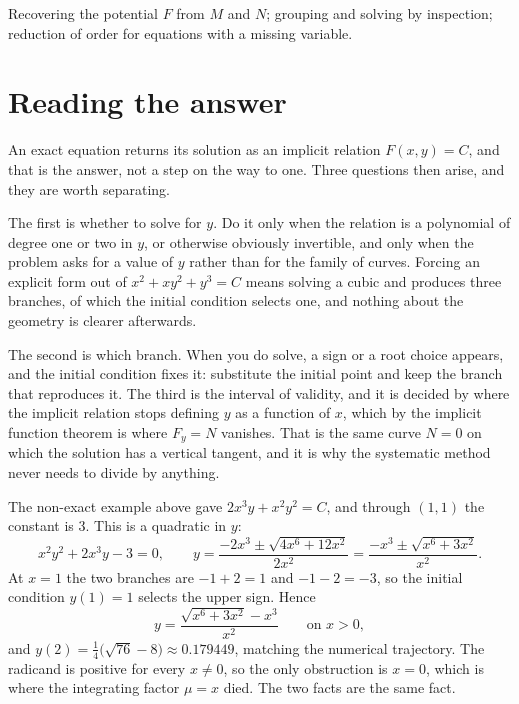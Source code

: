 \begin{seealsob}Recovering the potential $F$ from $M$ and $N$; grouping and solving by inspection; reduction of order for equations with a missing variable.\end{seealsob}

\section{Reading the answer}

An exact equation returns its solution as an implicit relation $F(x,y)=C$, and that is the answer, not a step on the way to one. Three questions then arise, and they are worth separating.

The first is whether to solve for $y$. Do it only when the relation is a polynomial of degree one or two in $y$, or otherwise obviously invertible, and only when the problem asks for a value of $y$ rather than for the family of curves. Forcing an explicit form out of $x^{2}+xy^{2}+y^{3}=C$ means solving a cubic and produces three branches, of which the initial condition selects one, and nothing about the geometry is clearer afterwards.

The second is which branch. When you do solve, a sign or a root choice appears, and the initial condition fixes it: substitute the initial point and keep the branch that reproduces it. The third is the interval of validity, and it is decided by where the implicit relation stops defining $y$ as a function of $x$, which by the implicit function theorem is where $F_y=N$ vanishes. That is the same curve $N=0$ on which the solution has a vertical tangent, and it is why the systematic method never needs to divide by anything.

\begin{worked}
The non-exact example above gave $2x^{3}y+x^{2}y^{2}=C$, and through $(1,1)$ the constant is $3$. This is a quadratic in $y$:
\[x^{2}y^{2}+2x^{3}y-3=0,\qquad y=\frac{-2x^{3}\pm\sqrt{4x^{6}+12x^{2}}}{2x^{2}}=\frac{-x^{3}\pm\sqrt{x^{6}+3x^{2}}}{x^{2}}.\]
At $x=1$ the two branches are $-1+2=1$ and $-1-2=-3$, so the initial condition $y(1)=1$ selects the upper sign. Hence
\[y=\frac{\sqrt{x^{6}+3x^{2}}-x^{3}}{x^{2}}\qquad\text{on }x>0,\]
and $y(2)=\tfrac14\bigl(\sqrt{76}-8\bigr)\approx0.179449$, matching the numerical trajectory. The radicand is positive for every $x\neq0$, so the only obstruction is $x=0$, which is where the integrating factor $\mu=x$ died. The two facts are the same fact.
\end{worked}

